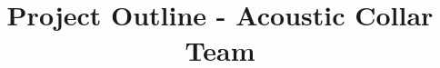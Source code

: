 




\documentclass[aspectratio=169]{beamer}
\usepackage{graphicx}
\usepackage{listings}
\lstset{
    basicstyle=\ttfamily
}
\usepackage{hyperref}
\usepackage{amsmath}
\usepackage{amssymb}
\usepackage{mathtools}
\usepackage[normalem]{ulem}
\title{Project Outline - Acoustic Collar Team}
[numbered]


